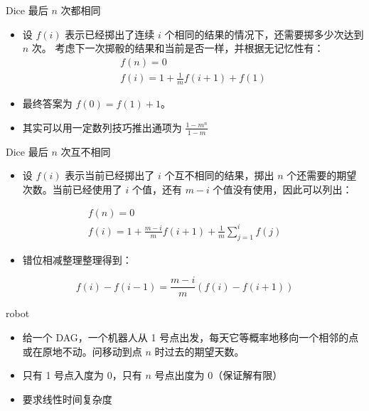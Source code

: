 \documentclass{beamer}
\begin{document}
    \begin{frame}{Dice}
        {最后 $n$ 次都相同}
        \begin{itemize}
            \setlength{\itemsep}{10pt}
            \item 设 $f(i)$ 表示已经掷出了连续 $i$ 个相同的结果的情况下，还需要掷多少次达到 $n$ 次。
            考虑下一次掷骰的结果和当前是否一样，并根据无记忆性有：
            \begin{gather*}
                f(n)=0\\
                f(i) = 1+\frac{1}{m}f(i+1)+f(1)
            \end{gather*}
            \item 最终答案为 $f(0)=f(1)+1$。
            \item 其实可以用一定数列技巧推出通项为 $\frac{1-m^n}{1-m}$
        \end{itemize}
    \end{frame}
    \begin{frame}{Dice}
        {最后 $n$ 次互不相同}
        \begin{itemize}
            \setlength{\itemsep}{10pt}
            \item 设 $f(i)$ 表示当前已经掷出了 $i$ 个互不相同的结果，掷出 $n$ 个还需要的期望次数。当前已经使用了 $i$ 个值，还有 $m-i$ 个值没有使用，因此可以列出：
        \end{itemize}
        \begin{gather*}
            f(n)=0\\
            f(i) = 1+ \frac{m-i}{m}f(i+1) + \frac1m\sum_{j=1}^{i}f(j)
        \end{gather*}
        \begin{itemize}
            \item 错位相减整理整理得到：
        \end{itemize}
        $$
            f(i)-f(i-1) = \frac{m-i}{m}\left(f(i)-f(i+1)\right)
        $$
    \end{frame}

    \begin{frame}{robot}
        \begin{itemize}
            \setlength{\itemsep}{10pt}
            \item 给一个 DAG，一个机器人从 1 号点出发，每天它等概率地移向一个相邻的点或在原地不动。问移动到点 $n$ 时过去的期望天数。
            \item 只有 1 号点入度为 $0$，只有 $n$ 号点出度为 $0$（保证解有限）
            \item 要求线性时间复杂度
        \end{itemize}
    \end{frame}
\end{document}
